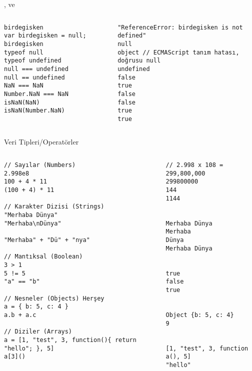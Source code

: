 \documentclass[xcolor=dvipsnames]{beamer}
\begin{document}
\begin{frame}[fragile]{,  ve }
\begin{columns}[T] %

\begin{column}{.42\textwidth}
\centering
\begin{verbatim}
birdegisken
var birdegisken = null; birdegisken
typeof null
typeof undefined
null === undefined
null == undefined
NaN === NaN
Number.NaN === NaN
isNaN(NaN)
isNaN(Number.NaN)
\end{verbatim}
\end{column}%

\begin{column}{.54\textwidth}
\begin{verbatim}
"ReferenceError: birdegisken is not defined"
null
object // ECMAScript tanım hatası, doğrusu null
undefined
false
true
false
false
true
true
\end{verbatim}
\end{column}%

\end{columns}

\end{frame}
\begin{frame}[fragile]{Veri Tipleri/Operatörler}
\begin{columns}[T] %

\begin{column}{.58\textwidth}
\centering
\begin{verbatim}
// Sayılar (Numbers)
2.998e8
100 + 4 * 11
(100 + 4) * 11

// Karakter Dizisi (Strings)
"Merhaba Dünya"
"Merhaba\nDünya"

"Merhaba" + "Dü" + "nya"

// Mantıksal (Boolean)
3 > 1
5 != 5
"a" == "b"

// Nesneler (Objects) Herşey
a = { b: 5, c: 4 }
a.b + a.c

// Diziler (Arrays)
a = [1, "test", 3, function(){ return "hello"; }, 5]
a[3]()
\end{verbatim}
\end{column}%

\begin{column}{.38\textwidth}
\begin{verbatim}
// 2.998 x 108 = 299,800,000
299800000
144
1144


Merhaba Dünya
Merhaba
Dünya
Merhaba Dünya


true
false
true


Object {b: 5, c: 4}
9


[1, "test", 3, function a(), 5]
"hello"
\end{verbatim}
\end{column}%

\end{columns}

\end{frame}
\end{document}
